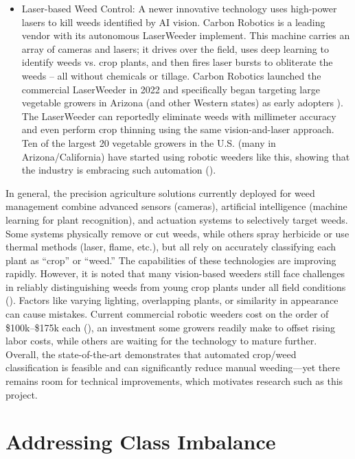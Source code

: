 \documentclass[letterpaper]{report}
\begin{document}
\begin{itemize}
	\item{Laser-based Weed Control: A newer innovative technology uses high-power lasers to kill weeds identified by AI vision. Carbon Robotics is a leading vendor with its autonomous LaserWeeder implement. This machine carries an array of cameras and lasers; it drives over the field, uses deep learning to identify weeds vs. crop plants, and then fires laser bursts to obliterate the weeds – all without chemicals or tillage. Carbon Robotics launched the commercial LaserWeeder in 2022 and specifically began targeting large vegetable growers in Arizona (and other Western states) as early adopters \cite{It2023-fx}). The LaserWeeder can reportedly eliminate weeds with millimeter accuracy and even perform crop thinning using the same vision-and-laser approach. Ten of the largest 20 vegetable growers in the U.S. (many in Arizona/California) have started using robotic weeders like this, showing that the industry is embracing such automation (\cite{Belton2021-mv}).}

\end{itemize}

In general, the precision agriculture solutions currently deployed for weed management combine advanced sensors (cameras), artificial intelligence (machine learning for plant recognition), and actuation systems to selectively target weeds. Some systems physically remove or cut weeds, while others spray herbicide or use thermal methods (laser, flame, etc.), but all rely on accurately classifying each plant as “crop” or “weed.” The capabilities of these technologies are improving rapidly. However, it is noted that many vision-based weeders still face challenges in reliably distinguishing weeds from young crop plants under all field conditions (\cite{American-Society-of-Agronomy2018-ad}). Factors like varying lighting, overlapping plants, or similarity in appearance can cause mistakes. Current commercial robotic weeders cost on the order of \$100k–\$175k each (\cite{American-Society-of-Agronomy2018-ad}), an investment some growers readily make to offset rising labor costs, while others are waiting for the technology to mature further. Overall, the state-of-the-art demonstrates that automated crop/weed classification is feasible and can significantly reduce manual weeding—yet there remains room for technical improvements, which motivates research such as this project.

\section{Addressing Class Imbalance}
\end{document}

